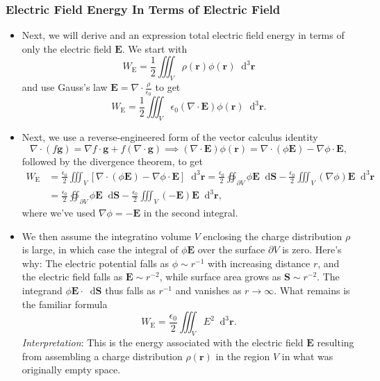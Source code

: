 \documentclass[11pt, a4paper]{article}
\newcommand{\diff}{\mathop{}\!\mathrm{d}} %
\newcommand{\dr}{\diff^{3} \r}  %
\renewcommand{\vec}[1]{\bm{#1}} %
\renewcommand{\r}{\vec{r}}
\newcommand{\E}{\vec{E}} %
\newcommand{\ee}{\epsilon_{0}}  %
\renewcommand{\div}{\nabla \cdot}
\renewcommand{\grad}{\nabla}
\begin{document}
\subsubsection{Electric Field Energy In Terms of Electric Field}
\begin{itemize}
	\item Next, we will derive and an expression total electric field energy in terms of only the electric field $ \E $. We start with
	\begin{equation*}
		W_{\text{E}} = \frac{1}{2} \iiint_{V} \rho(\r) \phi(\r) \dr
	\end{equation*}
	and use Gauss's law $ \E = \div \frac{\rho}{\ee} $ to get
	\begin{equation*}
		W_{\text{E}}  = \frac{1}{2} \iiint_{V} \ee (\div \E) \phi(\r) \dr.
	\end{equation*}
	
    \item Next, we use a reverse-engineered form of the vector calculus identity 
	\begin{equation*}
		\div (f \vec{g}) = \grad f \cdot \vec{g} + f (\div \vec{g}) \implies (\div \E) \phi(\r) = \div (\phi \E) - \grad \phi \cdot \E,
	\end{equation*}
	followed by the divergence theorem, to get
	\begin{align*}
		W_{\text{E}} &= \frac{\ee}{2} \iiint_{V}\left[\div (\phi \E) - \grad \phi \cdot \E\right] \dr = \frac{\ee}{2} \oiint_{\partial V} \phi \E \diff \vec{S} - \frac{\ee}{2} \iiint_{V} (\grad \phi) \E \dr\\
		& =  \frac{\ee}{2} \oiint_{\partial V} \phi \E \diff \vec{S} - \frac{\ee}{2} \iiint_{V} (- \E) \E \dr,
	\end{align*}
	where we've used $ \grad \phi = - \E $ in the second integral. 
	
	\item We then assume the integratino volume $ V $ enclosing the charge distribution $ \rho $ is large, in which case the integral of $ \phi \E $ over the surface $ \partial V $ is zero. Here's why: The electric potential falls as $ \phi \sim r^{-1} $ with increasing distance $ r $, and the electric field falls as $ \E \sim r^{-2} $, while surface area grows as $ \vec{S} \sim r^{-2} $. The integrand  $ \phi \E \cdot \diff \vec{S} $ thus falls as $ r^{-1} $ and vanishes as $ r \to \infty $. What remains is the familiar formula
	\begin{equation*}
		W_{\text{E}} = \frac{\ee}{2} \iiint_{V} E^{2} \dr.
	\end{equation*} 
	\textit{Interpretation}: This is the energy associated with the electric field $ \E $ resulting from assembling a charge distribution $ \rho(\r) $ in the region $ V $ in what was originally empty space.

\end{itemize}
\end{document}
